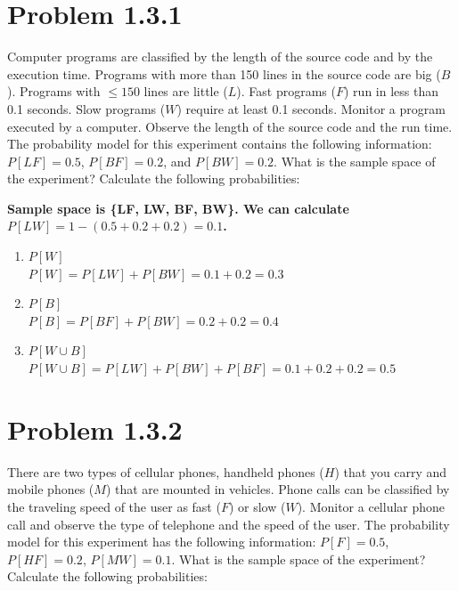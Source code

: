 \documentclass{article}
\begin{document}
\newpage

\section*{Problem 1.3.1}
Computer programs are classified by the length of the source code and by the execution time. Programs with more than 150 lines in the source code are big ($B$). Programs with $\le 150$ lines are little ($L$). Fast programs ($F$) run in less than 0.1 seconds. Slow programs ($W$) require at least 0.1 seconds. Monitor a program executed by a computer. Observe the length of the source code and the run time. The probability model for this experiment contains the following information: $P[LF] = 0.5$, $P[BF] = 0.2$, and $P[BW] = 0.2$. What is the sample space of the experiment? Calculate the following probabilities:

\vspace{1em}
{\boldmath\textbf{Sample space is \{LF, LW, BF, BW\}. We can calculate $P[LW] = 1 - (0.5+0.2+0.2) = 0.1$.}}

\begin{enumerate}[label=(\alph*)]
    \item $P[W]$ \\[1em]
    {\boldmath\textbf{$P[W] = P[LW] + P[BW] = 0.1 + 0.2 = 0.3$}}
    
    \item $P[B]$ \\[1em]
    {\boldmath\textbf{$P[B] = P[BF] + P[BW] = 0.2 + 0.2 = 0.4$}}
    
    \item $P[W \cup B]$ \\[1em]
    {\boldmath\textbf{$P[W \cup B] = P[LW] + P[BW] + P[BF] = 0.1 + 0.2 + 0.2 = 0.5$}}
\end{enumerate}

\newpage

\section*{Problem 1.3.2}
There are two types of cellular phones, handheld phones ($H$) that you carry and mobile phones ($M$) that are mounted in vehicles. Phone calls can be classified by the traveling speed of the user as fast ($F$) or slow ($W$). Monitor a cellular phone call and observe the type of telephone and the speed of the user. The probability model for this experiment has the following information: $P[F] = 0.5$, $P[HF] = 0.2$, $P[MW] = 0.1$. What is the sample space of the experiment? Calculate the following probabilities:
\end{document}
